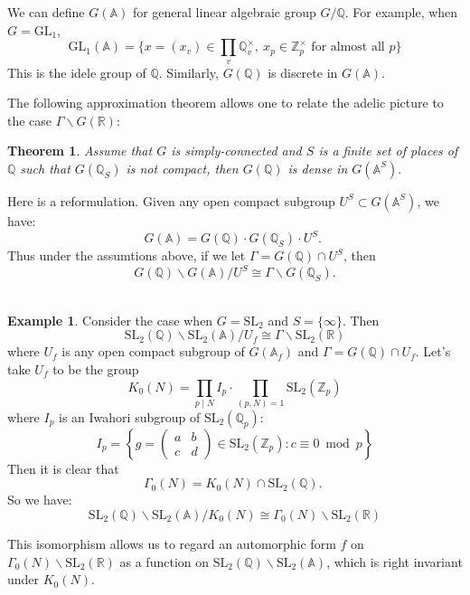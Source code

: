\documentclass[11pt,english]{smfart}
\newtheorem{theorem}{Theorem}
\theoremstyle{definition}
\newtheorem{example}{Example}
\theoremstyle{remark}
\begin{document}
We can define $G(\mathbb{A})$ for general linear algebraic group $G/\mathbb{Q}$.
For example, when $G=\mathrm{GL_1}$,
\[\mathrm{GL_1}(\mathbb{A})=\{ x=(x_v) \in \prod_{v} \mathbb{Q}_v^{\times},\ x_p \in \mathbb{Z}_p^{\times} \text{ for almost all }p\}\]
This is the idele group of $\mathbb{Q}$. Similarly, $G(\mathbb{Q})$ is discrete in $G(\mathbb{A})$.

The following approximation theorem allows one to relate the adelic picture to the case $\Gamma \backslash G(\mathbb{R})$:
\begin{theorem}
Assume that $ G $ is simply-connected and $ S $ is a finite set of places of $\mathbb{Q}$ such that $ G\left(\mathbb{Q}_{S}\right) $ is not compact, then $ G(\mathbb{Q}) $ is dense in $ G\left(\mathbb{A}^{S}\right) .$
\end{theorem}
Here is a reformulation. Given any open compact subgroup $ U^{S} \subset G\left(\mathbb{A}^{S}\right) $, we have:
\[G(\mathbb{A})=G(\mathbb{Q}) \cdot G\left(\mathbb{Q}_{S}\right) \cdot U^{S} \text {. }\]
Thus under the assumtions above, if we let $ \Gamma=G(\mathbb{Q}) \cap U^{S} $, then
\[G(\mathbb{Q}) \backslash G(\mathbb{A}) / U^{S} \cong \Gamma \backslash G\left(\mathbb{Q}_{S}\right).\]
\
\begin{example}
Consider the case when $ G=\mathrm{SL}_{2} $ and $ S=\{\infty\} $. Then
\[\mathrm{SL}_{2}(\mathbb{Q}) \backslash \mathrm{SL}_{2}(\mathbb{A}) / U_{f} \cong \Gamma \backslash \mathrm{SL}_{2}(\mathbb{R})\]
where $ U_{f} $ is any open compact subgroup of $ G\left(\mathbb{A}_{f}\right) $ and $ \Gamma=G(\mathbb{Q}) \cap U_{f} .$
Let's take ${U}_{f} $ to be the group
\[K_{0}(N)=\prod_{p \mid N} I_{p} \cdot \prod_{(p, N)=1} \mathrm{SL}_{2}\left(\mathbb{Z}_{p}\right)\]
where $ I_{p} $ is an Iwahori subgroup of $ \mathrm{SL}_{2}\left(\mathbb{Q}_{p}\right)$:
\[I_{p}=\left\{g=\left(\begin{array}{ll}
a & b \\
c & d
\end{array}\right) \in \mathrm{SL}_{2}\left(\mathbb{Z}_{p}\right): c \equiv 0 \bmod p\right\}\]
Then it is clear that
\[\Gamma_{0}(N)=K_{0}(N) \cap \mathrm{SL}_{2}(\mathbb{Q}) \text {. }\]
So we have:
\[\mathrm{SL}_{2}(\mathbb{Q}) \backslash \mathrm{SL}_{2}(\mathbb{A}) / K_{0}(N) \cong \Gamma_{0}(N) \backslash \mathrm{SL}_{2}(\mathbb{R})\]
\end{example}
This isomorphism allows us to regard an automorphic form $ f $ on $ \Gamma_0(N) \backslash \mathrm{SL}_2(\mathbb{R}) $ as a function on $ \mathrm{SL}_2(\mathbb{Q}) \backslash \mathrm{SL_2}(\mathbb{A}) $, which is right invariant under $K_0(N)$.
\end{document}
